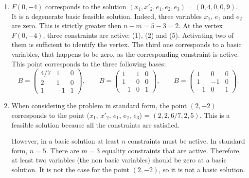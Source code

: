 \begin{enumerate}
\begin{itemize}
\item A solution is feasible if it satisfies all the constraints of the problem. In order to calculate the basic solutions,
we used the formula  $ x_B= \nolinebreak  B^{-1}b$. 
The non negativity constraints still need to be satisfied. The feasible solutions satisfy  $$ x_1, x'_2, e_1, e_2, e_3  \geq  0.$$
Therefore, the feasible basic solutions correspond to the following points:
\begin{center}
D(2, 0), C(5, 0), G(63/11, -8/11) and F(0, -4).
\end{center}
They correspond to the vertices of the polyhedron.
\end{itemize}

\item $F(0,-4)$ corresponds to the solution $(x_1,x'_2,e_1,e_2,e_3
  )=(0,4,0,0,9)$. It is a degenerate basic feasible solution.  Indeed, three variables
  $x_1$, $e_1$ and $e_2$ are zero. This is strictly greater then $ n-m
  = 5-3 =2$. At the vertex
  $F(0,-4)$, three constraints are active: (1), (2) and
  (5). Activating two of them is sufficient to identify the
  vertex. The third one corresponds to a basic variables, that happens
  to be zero, as the corresponding constraint is active.
  This point corresponds to the three following
  bases:
 \[
B = 
\begin{pmatrix}
4/7 & 1  & 0  \\
2 & 1  & 0 \\
1 & -1 & 1 
\end{pmatrix}, \qquad
B= \begin{pmatrix}
1  & 1 & 0  \\
1  & 0 & 0  \\
-1  & 0 & 1  
\end{pmatrix}, \qquad
B = \begin{pmatrix}
1  & 0 & 0 \\
1  & -1 & 0 \\
-1  & 0 & 1 
\end{pmatrix}.
\]

\item When considering the problem in standard form, the point $(2, -2)$ corresponds to the
  point ($ x_1 $, $ x'_2 $, $ e_1 $, $ e_2 $, $ e_3 $) = $(2, 2, 6/7, 2, 5 )$. This is a feasible solution because all the constraints are
   satisfied. 

However,  in a basic solution at least $n$ constraints must be active.
 In standard form, $n=5$. There are $m=3$ equality constraints that are active. 
Therefore, at least two variables (the non basic variables) should be zero at a basic solution. 
It is not the case for the point $(2,- 2)$, so it is not a basic solution.


\end{enumerate}
